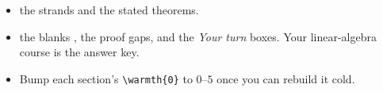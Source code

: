\documentclass{loom}
\begin{document}
\begin{itemize}[leftmargin=1.3em,itemsep=1pt]
  \item {} the strands and the stated theorems.
  \item {} the blanks \fillin[1.2cm], the  proof gaps, and
        the \emph{Your turn} boxes. Your linear-algebra course is the answer key.
  \item Bump each section's \texttt{\textbackslash warmth\{0\}} to $0$--$5$ once you can rebuild it cold.
\end{itemize}

\clearpage
{\small\tableofcontents}

\clearpage





\end{document}
